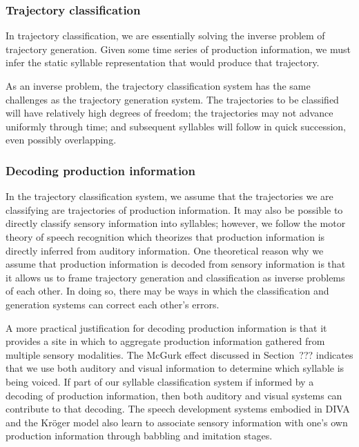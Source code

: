 \subsubsection{Trajectory classification}

In trajectory classification,
we are essentially solving the inverse problem
of trajectory generation.
Given some time series of production information,
we must infer the static syllable representation
that would produce that trajectory.

As an inverse problem,
the trajectory classification system
has the same challenges
as the trajectory generation system.
The trajectories to be classified
will have relatively high degrees of freedom;
the trajectories may not advance uniformly
through time;
and subsequent syllables will follow
in quick succession,
even possibly overlapping.

\subsubsection{Decoding production information}

In the trajectory classification system,
we assume that the trajectories we are classifying
are trajectories of production information.
It may also be possible to directly classify
sensory information into syllables;
however, we follow the motor theory of speech recognition
which theorizes that production information
is directly inferred from auditory information.
One theoretical reason
why we assume that production information
is decoded from sensory information
is that it allows us
to frame trajectory generation and
classification as inverse problems
of each other.
In doing so, there may be ways
in which the classification and generation systems
can correct each other's errors.

A more practical justification
for decoding production information
is that it provides a site in which to
aggregate production information
gathered from multiple sensory modalities.
The McGurk effect discussed in Section~???
indicates that we use both auditory
and visual information to
determine which syllable is being voiced.
If part of our syllable classification system
if informed by a decoding of production information,
then both auditory and visual systems
can contribute to that decoding.
The speech development systems
embodied in DIVA and the Kr\"{o}ger model
also learn to associate sensory information
with one's own production information
through babbling and imitation stages.

